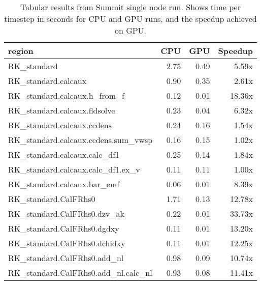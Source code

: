 \begin{table*}[htb]
  \centering
  \begin{tabular}{|l|rrr|}
  \hline
  region & CPU & GPU & Speedup \\
  \hline
  RK{\_}standard                                          &   2.75 &  0.49 &  5.59x \\
  RK{\_}standard.calcaux                                  &   0.90 &  0.35 &  2.61x \\
  RK{\_}standard.calcaux.h{\_}from{\_}f                   &   0.12 &  0.01 & 18.36x \\
  RK{\_}standard.calcaux.fldsolve                         &   0.23 &  0.04 &  6.32x \\
  RK{\_}standard.calcaux.ccdens                           &   0.24 &  0.16 &  1.54x \\
  RK{\_}standard.calcaux.ccdens.sum{\_}vwsp               &   0.16 &  0.15 &  1.02x \\
  RK{\_}standard.calcaux.calc{\_}df1                      &   0.25 &  0.14 &  1.84x \\
  RK{\_}standard.calcaux.calc{\_}df1.ex{\_}v              &   0.11 &  0.11 &  1.00x \\
  RK{\_}standard.calcaux.bar{\_}emf                       &   0.06 &  0.01 &  8.39x \\
  RK{\_}standard.CalFRhs0                                 &   1.71 &  0.13 & 12.78x \\
  RK{\_}standard.CalFRhs0.dzv{\_}ak                       &   0.22 &  0.01 & 33.73x \\
  RK{\_}standard.CalFRhs0.dgdxy                           &   0.11 &  0.01 & 13.20x \\
  RK{\_}standard.CalFRhs0.dchidxy                         &   0.11 &  0.01 & 12.25x \\
  RK{\_}standard.CalFRhs0.add{\_}nl                       &   0.98 &  0.09 & 10.74x \\
  RK{\_}standard.CalFRhs0.add{\_}nl.calc{\_}nl            &   0.93 &  0.08 & 11.41x \\
  \hline
  \end{tabular}
  \caption{Tabular results from Summit single node run. Shows time per timestep in seconds for CPU and GPU runs, and the speedup achieved on GPU.}
  \label{tab:single_node}
\end{table*}
